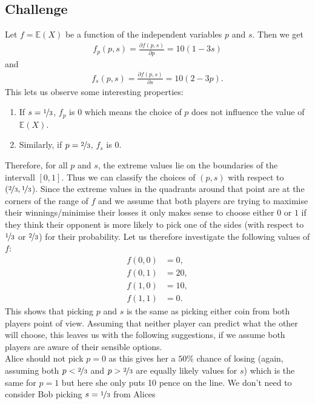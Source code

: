 \documentclass{article}
\newcommand{\E}{\mathbb{E}}
\begin{document}
\subsection*{Challenge}
Let $f=\E(X)$ be a function of the independent variables $p$ and $s$.
Then we get
\begin{align*}
  f_p(p,s)=\frac{\partial f(p,s)}{\partial p} = 10(1-3s)
\end{align*}
and
\begin{align*}
  f_s(p,s)=\frac{\partial f(p,s)}{\partial s} = 10(2-3p).
\end{align*}
This lets us observe some interesting properties:
\begin{enumerate}
  \item If $s=\nicefrac{1}{3}$, $f_p$ is $0$ which means the choice of
        $p$ does not influence the value of $\E(X)$.
  \item Similarly, if $p=\nicefrac{2}{3}$, $f_s$ is $0$.
\end{enumerate}
Therefore, for all $p$ and $s$, the extreme values lie on the boundaries
of the intervall $[0,1]$. Thus we can classify the choices of $(p,s)$ with
respect to $(\nicefrac{2}{3}, \nicefrac{1}{3}$). Since the extreme values
in the quadrants around that point are at the corners of the range of
$f$ and we assume that both players are trying to maximise their 
winnings/minimise their losses it only makes sense to choose either
$0$ or $1$ if they think their opponent is more likely to pick one of the
sides (with respect to $\nicefrac{1}{3}$ or $\nicefrac{2}{3}$) for their
probability. Let us therefore investigate the following values of $f$:
\begin{align*}
  f(0,0)&=0,\\
  f(0,1)&=20,\\
  f(1,0)&=10,\\
  f(1,1)&=0.
\end{align*}
This shows that picking $p$ and $s$ is the same as picking either
coin from both players point of view. Assuming that neither player
can predict what the other will choose, this leaves us with the following
suggestions, if we assume both players are aware of their sensible options.\\
Alice should not pick $p=0$ as this gives her a $50\%$ chance of losing 
(again, assuming both $p<\nicefrac{2}{3}$ and $p>\nicefrac{2}{3}$ 
are equally likely values for $s$)
which is the same for $p=1$ but here she only puts 10 pence on the line.
We don't need to consider Bob picking $s=\nicefrac{1}{3}$ from Alices
\end{document}
